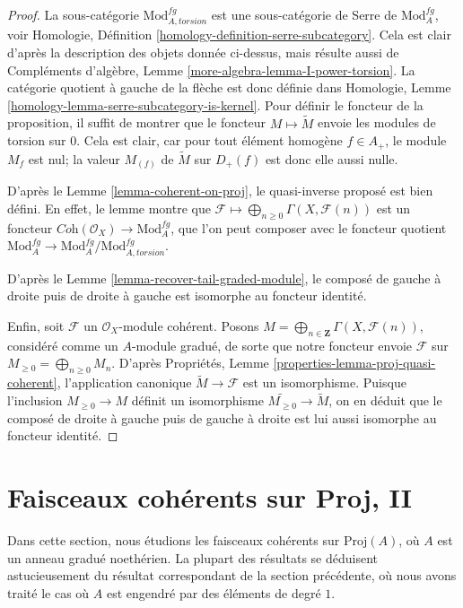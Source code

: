\begin{proof}
La sous-catégorie $\text{Mod}^{fg}_{A, torsion}$ est une sous-catégorie de Serre
de $\text{Mod}^{fg}_A$, voir
Homologie, Définition \ref{homology-definition-serre-subcategory}.
Cela est clair d'après la description des objets donnée ci-dessus, mais résulte aussi
de Compléments d'algèbre, Lemme \ref{more-algebra-lemma-I-power-torsion}.
La catégorie quotient à gauche de la flèche est donc définie
dans Homologie, Lemme \ref{homology-lemma-serre-subcategory-is-kernel}.
Pour définir le foncteur de la proposition, il suffit de montrer que
le foncteur $M \mapsto \widetilde M$ envoie les modules de torsion sur $0$.
Cela est clair, car pour tout élément homogène $f \in A_+$, le
module $M_f$ est nul; la valeur $M_{(f)}$ de $\widetilde M$
sur $D_+(f)$ est donc elle aussi nulle.

\medskip\noindent
D'après le Lemme \ref{lemma-coherent-on-proj}, le quasi-inverse proposé
est bien défini. En effet, le lemme montre que
$\mathcal{F} \longmapsto \bigoplus_{n \geq 0} \Gamma(X, \mathcal{F}(n))$
est un foncteur $\textit{Coh}(\mathcal{O}_X) \to \text{Mod}^{fg}_A$,
que l'on peut composer avec le foncteur quotient
$\text{Mod}^{fg}_A \to \text{Mod}^{fg}_A/\text{Mod}^{fg}_{A, torsion}$.

\medskip\noindent
D'après le Lemme \ref{lemma-recover-tail-graded-module},
le composé de gauche à droite puis de droite à gauche est isomorphe au foncteur identité.

\medskip\noindent
Enfin, soit $\mathcal{F}$ un $\mathcal{O}_X$-module cohérent.
Posons $M = \bigoplus_{n \in \mathbf{Z}} \Gamma(X, \mathcal{F}(n))$,
considéré comme un $A$-module gradué, de sorte que notre foncteur envoie $\mathcal{F}$ sur
$M_{\geq 0} = \bigoplus_{n \geq 0} M_n$.
D'après Propriétés, Lemme \ref{properties-lemma-proj-quasi-coherent},
l'application canonique $\widetilde M \to \mathcal{F}$
est un isomorphisme. Puisque l'inclusion
$M_{\geq 0} \to M$ définit un isomorphisme
$\widetilde{M_{\geq 0}} \to \widetilde M$, on en déduit que
le composé de droite à gauche puis de gauche à droite est lui aussi
isomorphe au foncteur identité.
\end{proof}



\section{Faisceaux cohérents sur Proj, II}
\label{section-coherent-proj-general}

\noindent
Dans cette section, nous étudions les faisceaux cohérents sur
$\text{Proj}(A)$, où $A$ est un anneau gradué noethérien. La plupart des
résultats se déduisent astucieusement du résultat correspondant de la section
précédente, où nous avons traité le cas où $A$ est engendré par des éléments de
degré $1$.

